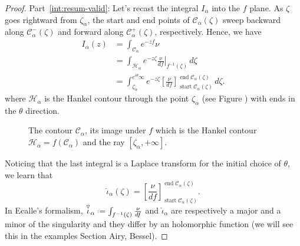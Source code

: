 \documentclass[11pt,a4paper,twoside,leqno,noamsfonts]{amsart}
\numberwithin{equation}{section}
\begin{document}
\begin{proof}
Part~\eqref{int:resum-valid}: Let's recast the integral $I_\alpha$ into the $f$ plane. As $\zeta$ goes rightward from $\zeta_\alpha$, the start and end points of $\mathcal{C}_\alpha(\zeta)$ sweep backward along $\mathcal{C}^-_\alpha(\zeta)$ and forward along $\mathcal{C}^+_\alpha(\zeta)$, respectively. Hence, we have
\begin{align*}
I_\alpha(z) & = \int_{\mathcal{C}_{\alpha}} e^{-zf} \nu \\
& = \int_{\mathcal{H}_{\alpha}} e^{-z\zeta} \left.\frac{\nu}{df}\right|_{f^{-1}(\zeta)}\,d\zeta \\
& = \int_{\zeta_\alpha}^{e^{i\theta}\infty} e^{-z\zeta} \left[\frac{\nu}{df}\right]_{\operatorname{start} \mathcal{C}_\alpha(\zeta)}^{\operatorname{end} \mathcal{C}_\alpha(\zeta)}\,d\zeta.
\end{align*}
where $\mathcal{H}_{\alpha}$ is the Hankel contour through the point $\zeta_{\alpha}$ (see Figure \cite{fig.paths}) with ends in the $\theta$ direction.
\begin{figure}
\caption{The contour $\mathcal{C}_\alpha$, its image under $f$ which is the Hankel contour $\mathcal{H}_{\alpha}=f(\mathcal{C}_{\alpha})$ and the ray $[\zeta_\alpha,+\infty]$. }
\end{figure}   
Noticing that the last integral is a Laplace transform for the initial choice of $\theta$, we learn that
\begin{equation}\label{thimble-difference}
\hat{\iota}_\alpha(\zeta) = \left[\frac{\nu}{df}\right]_{\operatorname{start} \mathcal{C}_\alpha(\zeta)}^{\operatorname{end} \mathcal{C}_\alpha(\zeta)}.
\end{equation}
In Ecalle's formalism, $\overset{\triangledown}{\iota}_\alpha\defeq\int_{f^{-1}(\zeta)}\frac{\nu}{df}$ and $\hat{\iota}_\alpha$ are respectively a major and a minor of the singularity and they differ by an holomorphic function (we will see this in the examples Section Airy, Bessel). 



\end{proof}
\end{document}
